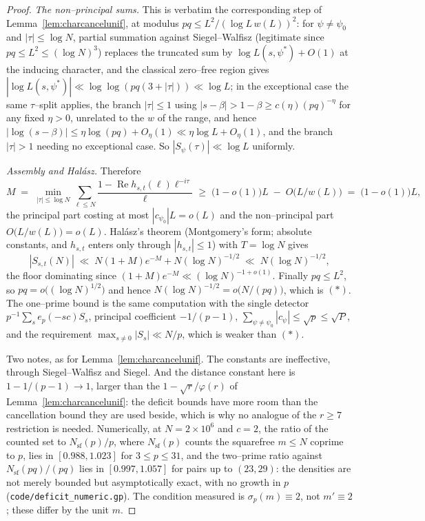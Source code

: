\documentclass[11pt]{article}
\theoremstyle{definition}
\begin{document}
\begin{proof}
\emph{The non--principal sums.} This is verbatim the corresponding step of
Lemma~\ref{lem:charcancelunif}, at modulus $pq\le L^2/(\log L\,w(L))^2$:
for $\psi\ne\psi_0$ and $|\tau|\le\log N$, partial summation against Siegel--Walfisz (legitimate
since $pq\le L^2\le(\log N)^3$) replaces the truncated sum by $\log L(s,\psi^*)+O(1)$ at the
inducing character, and the classical zero--free region gives
$|\log L(s,\psi^*)|\ll\log\log(pq(3+|\tau|))\ll\log L$; in the exceptional case the same
$\tau$--split applies, the branch $|\tau|\le1$ using
$|s-\beta|>1-\beta\ge c(\eta)(pq)^{-\eta}$ for any fixed $\eta>0$, unrelated to the
$w$ of the range, and hence
$|\log(s-\beta)|\le\eta\log(pq)+O_\eta(1)\ll\eta\log L+O_\eta(1)$, and
the branch $|\tau|>1$ needing no exceptional case. So $|S_\psi(\tau)|\ll\log L$ uniformly.

\emph{Assembly and Hal\'asz.} Therefore
\[ M\;=\;\min_{|\tau|\le\log N}\sum_{\ell\le N}\frac{1-\operatorname{Re}h_{s,t}(\ell)\ell^{-i\tau}}{\ell}
   \;\ge\;\bigl(1-o(1)\bigr)L\;-\;O\bigl(L/w(L)\bigr)\;=\;\bigl(1-o(1)\bigr)L, \]
the principal part costing at most $|c_{\psi_0}|L=o(L)$ and the non--principal part
$O\bigl(L/w(L)\bigr)=o(L)$. Hal\'asz's theorem (Montgomery's form; absolute constants, and
$h_{s,t}$ enters only through $|h_{s,t}|\le1$) with $T=\log N$ gives
\[ |S_{s,t}(N)|\;\ll\;N(1+M)e^{-M}+N(\log N)^{-1/2}\;\ll\;N(\log N)^{-1/2}, \]
the floor dominating since $(1+M)e^{-M}\ll(\log N)^{-1+o(1)}$. Finally
$pq\le L^2$, so $pq=o\bigl((\log N)^{1/2}\bigr)$ and hence
$N(\log N)^{-1/2}=o\bigl(N/(pq)\bigr)$, which is $(\ast)$. The
one--prime bound is the same computation with the single detector $p^{-1}\sum_s e_p(-sc)S_s$,
principal coefficient $-1/(p-1)$, $\sum_{\psi\ne\psi_0}|c_\psi|\le\sqrt p\le\sqrt P$, and
the requirement $\max_{s\ne0}|S_s|\ll N/p$, which is weaker than $(\ast)$.

Two notes, as for Lemma~\ref{lem:charcancelunif}. The constants are ineffective, through
Siegel--Walfisz and Siegel. And the distance constant here is $1-1/(p-1)\to1$, larger than the
$1-\sqrt r/\varphi(r)$ of Lemma~\ref{lem:charcancelunif}: the deficit bounds have more room than the
cancellation bound they are used beside, which is why no analogue of the $r\ge7$ restriction is
needed. Numerically, at $N=2\times10^6$ and $c=2$, the ratio of the
counted set to $N_{\mathrm{sf}}(p)/p$, where $N_{\mathrm{sf}}(p)$ counts the squarefree $m\le N$
coprime to $p$, lies in $[0.988,1.023]$ for $3\le p\le31$, and the two--prime ratio against
$N_{\mathrm{sf}}(pq)/(pq)$ lies in $[0.997,1.057]$ for pairs up to $(23,29)$: the densities are not
merely bounded but asymptotically exact, with no growth in $p$
\textup{(\texttt{code/deficit\_numeric.gp})}. The condition measured is $\sigma_p(m)\equiv2$, not
$m'\equiv2$; these differ by the unit $m$.
\end{proof}
\end{document}
